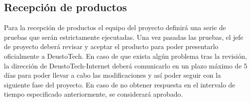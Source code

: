 \subsection{Recepción de productos}

Para la recepción de productos el equipo del proyecto definirá una serie de pruebas que serán estrictamente ejecutadas. Una vez pasadas las pruebas, el jefe de proyecto deberá revisar y aceptar el producto para poder presentarlo oficialmente a DeustoTech.  En caso de que exista algún problema tras la revisión,  la dirección de DeustoTech-Internet deberá comunicarlo en un plazo máximo de 5 días para poder llevar a cabo las modificaciones y así poder seguir con la siguiente fase del proyecto. En caso de no obtener respuesta en el intervalo de tiempo especificado anteriormente, se considerará aprobado.